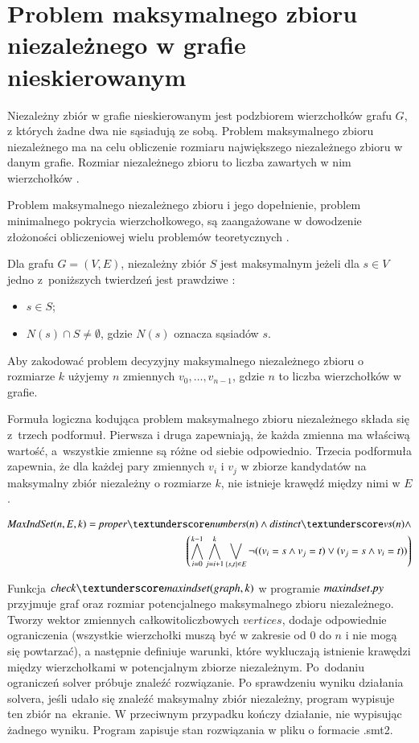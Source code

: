 


\section{Problem maksymalnego zbioru niezależnego w grafie nieskierowanym}
Niezależny zbiór w grafie nieskierowanym jest podzbiorem wierzchołków grafu $G$, z których żadne dwa nie sąsiadują ze sobą. Problem maksymalnego zbioru niezależnego ma na celu obliczenie rozmiaru największego niezależnego zbioru w danym grafie. Rozmiar niezależnego zbioru to liczba zawartych w nim wierzchołków \cite{Korshunov1974}.

Problem maksymalnego niezależnego zbioru i jego dopełnienie, problem minimalnego pokrycia wierzchołkowego, są zaangażowane w dowodzenie złożoności obliczeniowej wielu problemów teoretycznych \cite{Skiena20}.

Dla grafu $G = (V, E)$, niezależny zbiór \(S\) jest maksymalnym jeżeli dla $s \in V$ jedno z~poniższych twierdzeń jest prawdziwe \cite{maxIndSetDef}:

\begin{itemize}
	\item $s \in S$;
	\item $N(s) \cap S \neq \emptyset$, gdzie \(N(s)\) oznacza sąsiadów \(s\).
\end{itemize}

Aby zakodować problem decyzyjny maksymalnego niezależnego zbioru o rozmiarze $k$ użyjemy $n$ zmiennych $v_0,\ldots,v_{n-1}$, gdzie $n$ to liczba wierzchołków w grafie.

Formuła logiczna kodująca problem maksymalnego zbioru niezależnego składa się z~trzech podformuł. Pierwsza i druga zapewniają, że każda zmienna ma właściwą wartość, a~wszystkie zmienne są różne od siebie odpowiednio. Trzecia podformuła zapewnia, że dla każdej pary zmiennych \(v_i\) i \(v_j\) w zbiorze kandydatów na maksymalny zbiór niezależny o rozmiarze \(k\), nie istnieje krawędź między nimi w \(E\).

\begin{align*}
	\MaxIndSet(n, E, k) = \propernumbers(n) \land \distinctvs(n)  \land \\
	\left( \bigwedge_{i=0}^{k-1} \bigwedge_{j=i+1}^{k} \bigvee_{\{s,t\} \in E} \lnot((v_i = s \land v_j = t) \lor (v_j = s \land v_i = t)) \right)	
\end{align*}

Funkcja $\checkmaxindset$  w programie ${\mathit{maxindset.py}}$ przyjmuje graf oraz rozmiar potencjalnego maksymalnego zbioru niezależnego. Tworzy wektor zmiennych całkowitoliczbowych $vertices$, dodaje odpowiednie ograniczenia (wszystkie wierzchołki muszą być w zakresie od $0$ do $n$ i nie mogą się powtarzać), a następnie definiuje warunki, które wykluczają istnienie krawędzi między wierzchołkami w potencjalnym zbiorze niezależnym. Po~dodaniu ograniczeń solver próbuje znaleźć rozwiązanie. Po sprawdzeniu wyniku działania solvera, jeśli udało się znaleźć maksymalny zbiór niezależny, program wypisuje ten zbiór na~ekranie. W przeciwnym przypadku kończy działanie, nie wypisując żadnego wyniku. Program zapisuje stan rozwiązania w pliku o formacie .smt2.


